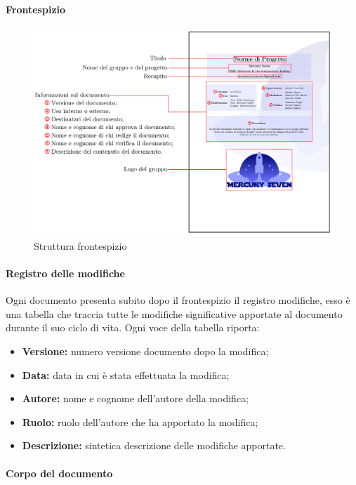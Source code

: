 {\paragraph{Frontespizio}    

\begin{figure}[H]
    \centering
    \includegraphics[scale = 0.6]{components/immagini/frontespizio.png}
    \caption{Struttura frontespizio}
\end{figure}


\paragraph{Registro delle modifiche}      
Ogni documento presenta subito dopo il frontespizio il registro modifiche, esso è una tabella che traccia tutte le modifiche significative apportate al documento durante il suo ciclo di vita. Ogni voce della tabella riporta:
\begin{itemize}
	\item \textbf{Versione:} numero versione documento dopo la modifica;
	\item \textbf{Data:} data in cui è stata effettuata la modifica;
	\item \textbf{Autore:} nome e cognome dell'autore della modifica;
	\item \textbf{Ruolo:} ruolo dell'autore che ha apportato la modifica;
	\item \textbf{Descrizione:} sintetica descrizione delle modifiche apportate.
\end{itemize}
\paragraph{Corpo del documento}       

}
